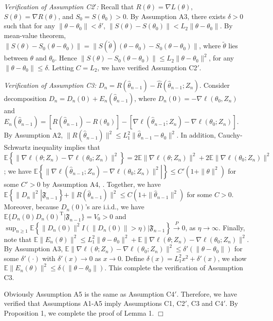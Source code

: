 \documentclass[twoside,11pt]{article}
\def\trans{^{ \mathrm{\scriptscriptstyle T} }}
\def\wh{\widehat}
\def\wt{\widetilde}
\begin{document}
{\it Verification of Assumption C2$'$:} Recall that $R(\theta)=\nabla L(\theta)$, $S(\theta)=\nabla R(\theta)$, and $S_0=S(\theta_0)>0$. By Assumption A3, there exists $\delta>0$ such that for any $\|\theta-\theta_0\|<\delta'$, $\|S(\theta)-S(\theta_0)\|<L_2\|\theta-\theta_0\|$. By mean-value theorem, $\|S(\theta)-S_0(\theta-\theta_0)\|=\|S(\wt{\theta})(\theta-\theta_0)-S_0(\theta-\theta_0)\|$, where $\wt{\theta}$ lies between $\theta$ and $\theta_0$. Hence $\|S(\theta)-S_0(\theta-\theta_0)\|\leq L_2\|\theta-\theta_0\|^2$, for any $\|\theta-\theta_0\|\leq \delta$. Letting $C=L_2$, we have verified Assumption C2$'$.

{\it Verification of Assumption C3:}  $D_n=R(\wh{\theta}_{n-1})-\wh{R}(\wh{\theta}_{n-1}; Z_n)$. Consider decomposition $D_n=D_n(0)+E_n(\wh{\theta}_{n-1})$, where $D_n(0)=-\nabla \ell(\theta_0, Z_n)$ and $E_n(\wh{\theta}_{n-1})=[R(\wh{\theta}_{n-1})-R(\theta_0)]-[\nabla \ell(\wh{\theta}_{n-1}; Z_n)-\nabla \ell(\theta_0; Z_n)]$. By Assumption A2, $\|R(\wh{\theta}_{n-1})\|^2\leq L_1^2 \|\wh{\theta}_{n-1}-\theta_0\|^2$. In addition, Cauchy-Schwartz inequality implies that $\mathbb{E}\left\{\|\nabla \ell(\theta; Z_n)-\nabla \ell(\theta_0; Z_n)\|^2\right\}=2\mathbb{E}\|\nabla \ell(\theta; Z_n)\|^2+2\mathbb{E}\|\nabla \ell(\theta_0; Z_n)\|^2$; we have $\mathbb{E}\left\{\|\nabla \ell(\wh{\theta}_{n-1}; Z_n)-\nabla \ell(\theta_0; Z_n)\|^2\left.\right|\right\}\leq C'(1+\|\theta\|^2)$ for some $C'>0$ by Assumption A4, . Together, we have  $\mathbb{E}\left\{\|D_n\|^2\left.\right|\mathfrak{F}_{n-1}\right\}+\|R(\wh{\theta}_{n-1})\|^2\leq C\left(1+\|\wh{\theta}_{n-1}\|^2\right)$ for some $C>0$. Moreover, because $D_n(0)$'s are i.i.d., we have $\mathbb{E}\{D_n(0)D_n(0)\trans|\mathfrak{F}_{n-1}\}=V_0>0$ and
$\sup_{n\geq 1}\mathbb{E}\left\{\|D_n(0)\|^2I(\|D_n(0)\|>\eta)|\mathfrak{F}_{n-1}\right\}\stackrel{P}{\rightarrow} 0$, as $\eta\rightarrow\infty$. Finally, note that $\mathbb{E}\|E_n(\theta)\|^2\leq L^2_1\|\theta-\theta_0\|^2+\mathbb{E}\|\nabla \ell(\theta; Z_n)-\nabla \ell(\theta_0; Z_n)\|^2$. By Assumption A3, $\mathbb{E}\|\nabla \ell(\theta; Z_n)-\nabla \ell(\theta_0; Z_n)\|^2\leq \delta'(\|\theta-\theta_0\|)$ for some $\delta'(\cdot)$ with $\delta'(x)\rightarrow 0$ as $x\rightarrow 0$. Define $\delta(x)=L_1^2 x^2 + \delta'(x)$, we show $\mathbb{E}\|E_n(\theta)\|^2\leq \delta(\|\theta-\theta_0\|)$. This complete the verification of Assumption C3.

Obviously Assumption A5 is the same as Assumption C4$'$. Therefore, we have verified that Assumptions A1-A5 imply Assumptions C1, C2$'$, C3 and C4$'$. By Proposition 1, we complete the proof of Lemma 1. $\Box$
\end{document}
